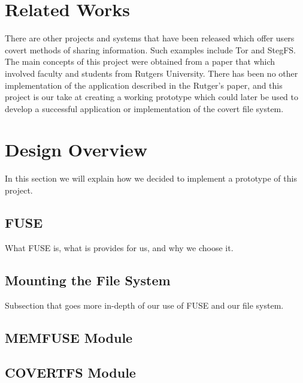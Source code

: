 \documentclass[12pt,journal,compsoc]{IEEEtran}
\begin{document}
\section{Related Works}
There are other projects and systems that have been released which offer users covert methods of sharing information. Such examples include Tor and StegFS\cite{Tan2003}. The main concepts of this project were obtained from a paper that which involved faculty and students from Rutgers University\cite{Baliga2007}.  There has been no other implementation of the application described in the Rutger's paper, and this project is our take at creating a working prototype which could later be used to develop a successful application or implementation of the covert file system.


\section{Design Overview}

In this section we will explain how we decided to implement a prototype of this project.



\subsection{FUSE}

What FUSE is, what is provides for us, and why we choose it.

\subsection{Mounting the File System}

Subsection that goes more in-depth of our use of FUSE and our file system.

\subsection{MEMFUSE Module}

\subsection{COVERTFS Module}
\end{document}
